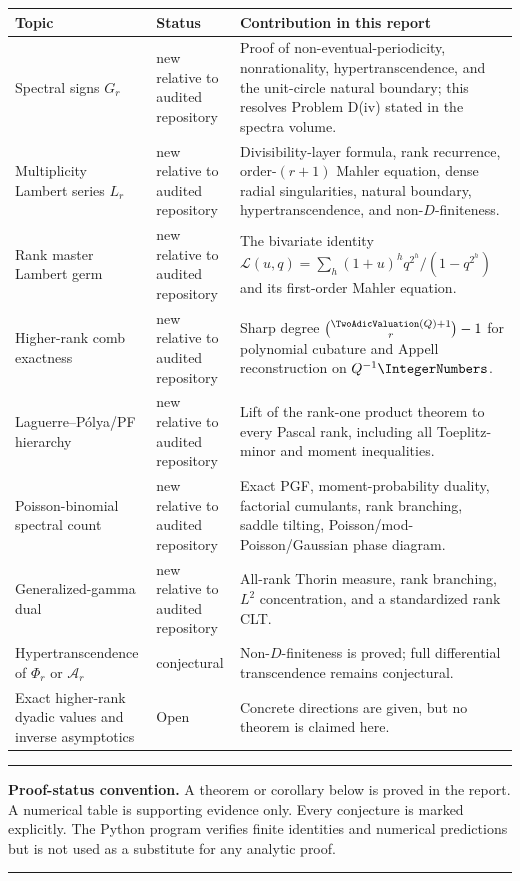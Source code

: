 \documentclass[11pt,oneside]{article}
\theoremstyle{definition}
\theoremstyle{remark}
\newcommand{\Ar}{\mathcal A}
\newcommand{\New}{\textcolor{provedgreen}{\textsf{new relative to audited repository}}}
\newcommand{\Conj}{\textcolor{conjpurple}{\textsf{conjectural}}}
\newenvironment{resultbox}{%
  \par\smallskip\noindent\begin{center}\begin{minipage}{0.94\textwidth}%
  \hrule\vspace{0.65em}\small
}{%
  \vspace{0.65em}\hrule\end{minipage}\end{center}\smallskip
}
\begin{document}
\begin{longtable}{@{}p{}p{}p{}@{}}
\toprule
Topic & Status & Contribution in this report\\
\midrule
\endhead
Spectral signs $G_r$ & \New & Proof of non-eventual-periodicity, nonrationality, hypertranscendence, and the unit-circle natural boundary; this resolves Problem D(iv) stated in the spectra volume.\\
Multiplicity Lambert series $L_r$ & \New & Divisibility-layer formula, rank recurrence, order-$(r+1)$ Mahler equation, dense radial singularities, natural boundary, hypertranscendence, and non-$D$-finiteness.\\
Rank master Lambert germ & \New & The bivariate identity $\mathscr L(u,q)=\sum_h(1+u)^h q^{2^h}/(1-q^{2^h})$ and its first-order Mahler equation.\\
Higher-rank comb exactness & \New & Sharp degree $\binom{\TwoAdicValuation(Q)+1}{r}-1$ for polynomial cubature and Appell reconstruction on $Q^{-1}\IntegerNumbers$.\\
Laguerre--P\'olya/PF hierarchy & \New & Lift of the rank-one product theorem to every Pascal rank, including all Toeplitz-minor and moment inequalities.\\
Poisson-binomial spectral count & \New & Exact PGF, moment-probability duality, factorial cumulants, rank branching, saddle tilting, Poisson/mod-Poisson/Gaussian phase diagram.\\
Generalized-gamma dual & \New & All-rank Thorin measure, rank branching, $L^2$ concentration, and a standardized rank CLT.\\
Hypertranscendence of $\Phi_r$ or $\Ar_r$ & \Conj & Non-$D$-finiteness is proved; full differential transcendence remains conjectural.\\
Exact higher-rank dyadic values and inverse asymptotics & Open & Concrete directions are given, but no theorem is claimed here.\\
\bottomrule
\end{longtable}

\begin{resultbox}
\textbf{Proof-status convention.}
A theorem or corollary below is proved in the report.  A numerical table is
supporting evidence only.  Every conjecture is marked explicitly.  The
Python program verifies finite identities and numerical predictions but is
not used as a substitute for any analytic proof.
\end{resultbox}
\end{document}
